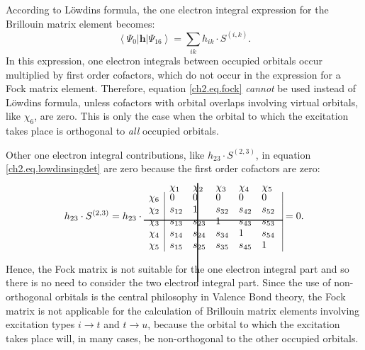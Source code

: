 According to L\"{o}wdins formula, the one electron integral expression for the Brillouin matrix element becomes:
\begin{equation}
\left< \Psi_0 | \mathbf{h} | \Psi_{16} \right> = \sum_{ik} h_{ik} \cdot S^{(i,k)}.
\label{ch2.eq.lowdinsingdet}
\end{equation}
In this expression, one electron integrals between occupied orbitals occur multiplied by first order cofactors, which do not occur in the expression for a Fock matrix element. Therefore, equation \ref{ch2.eq.fock} \textit{cannot} be used instead of L\"{o}wdins formula, unless cofactors with orbital overlaps involving virtual orbitals, like $\chi_6$, are zero. This is only the case when the orbital to which the excitation takes place is orthogonal to \textit{all} occupied orbitals.

Other one electron integral contributions, like $h_{23} \cdot S^{(2,3)}$, in equation \ref{ch2.eq.lowdinsingdet} are zero because the first order cofactors are zero:
\begin{equation}
h_{23} \cdot S^{(2,3)} = h_{23} \cdot
\begin{array}{llllll}
 & \hskip 28.0 pt \hbox{\lower 93pt\hbox{\vrule height100pt width 1.0pt}}\hskip-29.0pt \chi_1 & \chi_2 & \chi_3 & \chi_4 & \chi_5 \\
 \noalign{\vskip-91pt}
 \chi_6 & \multicolumn{1}{|l}{ 0 } & 0 & 0 & 0 & \multicolumn{1}{l|}{ 0 } \\
 \chi_2 & \multicolumn{1}{|l}{ s_{12} } & 1 & s_{32} & s_{42} & \multicolumn{1}{l|}{ s_{52} } \\
 \chi_3 & \multicolumn{1}{|l}{ s_{13} } & s_{23} & 1 & s_{43} & \multicolumn{1}{l|}{ s_{53} } \\
 \noalign{\vskip-8pt}
 \multispan6\hbox{\vrule  height 1.0 pt width140pt}\cr
 \noalign{\vskip 7pt}
 \chi_4 & \multicolumn{1}{|l}{ s_{14} } & s_{24} & s_{34} & 1 & \multicolumn{1}{l|}{ s_{54} } \\
 \chi_5 & \multicolumn{1}{|l}{ s_{15} } & s_{25} & s_{35} & s_{45} & \multicolumn{1}{l|}{ 1 }
\end{array} = 0.
\label{ch2.eq.h23}
\end{equation}

Hence, the Fock matrix is not suitable for the one electron integral part and so there is no need to consider the two electron integral part. Since the use of non-orthogonal orbitals is the central philosophy in Valence Bond theory, the Fock matrix is not applicable for the calculation of Brillouin matrix elements involving excitation types  $i \rightarrow t$ and $t \rightarrow u$, because the orbital to which the excitation takes place will, in many cases, be non-orthogonal to the other occupied orbitals. 
 
